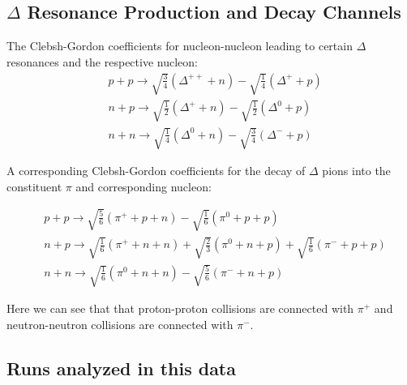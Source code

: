
\subsection{$\Delta$ Resonance Production and Decay Channels}
\label{appen:deltadecay}

The Clebsh-Gordon coefficients for nucleon-nucleon leading to certain $\Delta$ resonances and the respective nucleon: 
\begin{equation}
\begin{split}
& p + p \rightarrow \sqrt{\frac{3}{4}}(\Delta^{++} + n) - \sqrt{\frac{1}{4}}(\Delta^{+} + p) \\
& n + p \rightarrow \sqrt{\frac{1}{2}}(\Delta^{+} + n) - \sqrt{\frac{1}{2}}(\Delta^{0} + p)  \\
& n + n \rightarrow \sqrt{\frac{1}{4}}(\Delta^{0} + n) - \sqrt{\frac{3}{4}}(\Delta^{-} + p) 
\end{split}
\label{eq:deltaProduction}
\end{equation}

A corresponding Clebsh-Gordon coefficients for the decay of $\Delta$ pions into the constituent $\pi$ and corresponding nucleon:

\begin{equation}
\begin{split}
& p + p \rightarrow \sqrt{\frac{5}{6}}(\pi^+ + p + n) - \sqrt{\frac{1}{6}}(\pi^0 + p + p) \\
& n + p \rightarrow \sqrt{\frac{1}{6}}(\pi^+ + n + n) + \sqrt{\frac{2}{3}}(\pi^0 + n + p) + \sqrt{\frac{1}{6}}(\pi^- + p + p)  \\
& n + n \rightarrow \sqrt{\frac{1}{6}}(\pi^0 + n + n) - \sqrt{\frac{5}{6}}(\pi^- + n + p) 
\end{split}
\label{eq:deltaProduction}
\end{equation}

Here we can see that that proton-proton collisions are connected with $\pi^+$ and neutron-neutron collisions are connected with $\pi^-$. 


\subsection{Runs analyzed in this data}

\newcommand{\hsn}{$^{132}$Sn+$^{124}$Sn}
\newcommand{\mhsn}{$^{124}$Sn+$^{112}$Sn}
\newcommand{\mlsn}{$^{112}$Sn+$^{124}$Sn}
\newcommand{\lsn}{$^{108}$Sn+$^{112}$Sn}


